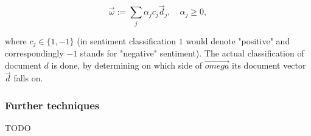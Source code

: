 \begin{equation*}
\vec{\omega} := \sum_j \alpha_j c_j \vec{d}_j,\quad \alpha_j \geq 0,
\end{equation*}

where $c_j \in \lbrace 1, -1\rbrace$ (in sentiment classification $1$ would denote "positive" and correspondingly $-1$ stands for "negative" sentiment). The actual classification of document $d$ is done, by determining on which side of $\vec{omega}$ its document vector $\vec{d}$ falls on.

\subsubsection*{Further techniques}

TODO